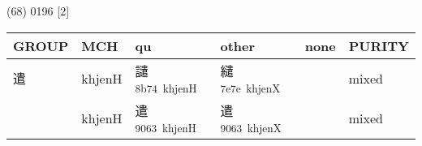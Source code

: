 \documentclass[14pt,a4paper]{scrartcl}
\begin{document}
(68) 0196 {[}2{]}

\begin{longtable}[c]{@{}llllll@{}}
\toprule
\begin{minipage}[b]{0.14\columnwidth}\raggedright\strut
GROUP
\strut\end{minipage} &
\begin{minipage}[b]{0.14\columnwidth}\raggedright\strut
MCH
\strut\end{minipage} &
\begin{minipage}[b]{0.14\columnwidth}\raggedright\strut
qu
\strut\end{minipage} &
\begin{minipage}[b]{0.14\columnwidth}\raggedright\strut
other
\strut\end{minipage} &
\begin{minipage}[b]{0.14\columnwidth}\raggedright\strut
none
\strut\end{minipage} &
\begin{minipage}[b]{0.14\columnwidth}\raggedright\strut
PURITY
\strut\end{minipage}\tabularnewline
\midrule
\endhead
\begin{minipage}[t]{0.14\columnwidth}\raggedright\strut
遣
\strut\end{minipage} &
\begin{minipage}[t]{0.14\columnwidth}\raggedright\strut
khjenH
\strut\end{minipage} &
\begin{minipage}[t]{0.14\columnwidth}\raggedright\strut
譴\textsuperscript{8b74~khjenH}
\strut\end{minipage} &
\begin{minipage}[t]{0.14\columnwidth}\raggedright\strut
繾\textsuperscript{7e7e~khjenX}
\strut\end{minipage} &
\begin{minipage}[t]{0.14\columnwidth}\raggedright\strut
\strut\end{minipage} &
\begin{minipage}[t]{0.14\columnwidth}\raggedright\strut
mixed
\strut\end{minipage}\tabularnewline
\begin{minipage}[t]{0.14\columnwidth}\raggedright\strut
𠳋
\strut\end{minipage} &
\begin{minipage}[t]{0.14\columnwidth}\raggedright\strut
khjenH
\strut\end{minipage} &
\begin{minipage}[t]{0.14\columnwidth}\raggedright\strut
遣\textsuperscript{9063~khjenH}
\strut\end{minipage} &
\begin{minipage}[t]{0.14\columnwidth}\raggedright\strut
遣\textsuperscript{9063~khjenX}
\strut\end{minipage} &
\begin{minipage}[t]{0.14\columnwidth}\raggedright\strut
\strut\end{minipage} &
\begin{minipage}[t]{0.14\columnwidth}\raggedright\strut
mixed
\strut\end{minipage}\tabularnewline
\bottomrule
\end{longtable}
\end{document}
